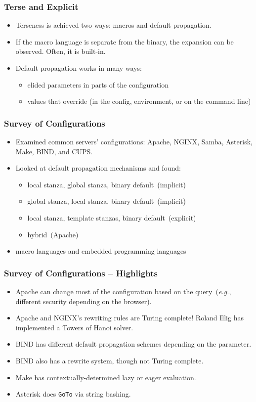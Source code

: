 \documentclass{beamer}
\begin{document}
\begin{frame}\frametitle{Terse and Explicit}
\begin{itemize}
\item Terseness is achieved two ways: macros and default propagation.
\item If the macro language is separate from the binary, the expansion can be observed. Often, it is built-in.
\item Default propagation works in many ways:
\begin{itemize}
\item elided parameters in parts of the configuration
\item values that override (in the config, environment, or on the command line)
\end{itemize}
\end{itemize}
\end{frame}

\begin{frame}\frametitle{Survey of Configurations}
\begin{itemize}
\item Examined common servers' configurations: Apache, NGINX, Samba, Asterisk, Make, BIND, and CUPS.
\item Looked at default propagation mechanisms and found:
\begin{itemize}
\item local stanza, global stanza, binary default~(implicit)
\item global stanza, local stanza, binary default~(implicit)
\item local stanza, template stanzas, binary default~(explicit)
\item hybrid~(Apache)
\end{itemize}
\item macro languages and embedded programming languages
\end{itemize}
\end{frame}

\begin{frame}\frametitle{Survey of Configurations -- Highlights}
\begin{itemize}
\item Apache can change most of the configuration based on the query~(\emph{e.g.}, different security depending on the browser).
\item Apache and NGINX's rewriting rules are Turing complete! Roland Illig has implemented a Towers of Hanoi solver.
\item BIND has different default propagation schemes depending on the parameter.
\item BIND also has a rewrite system, though not Turing complete.
\item Make has contextually-determined lazy or eager evaluation.
\item Asterisk does \texttt{GoTo} via string bashing.
\end{itemize}
\end{frame}
\end{document}
